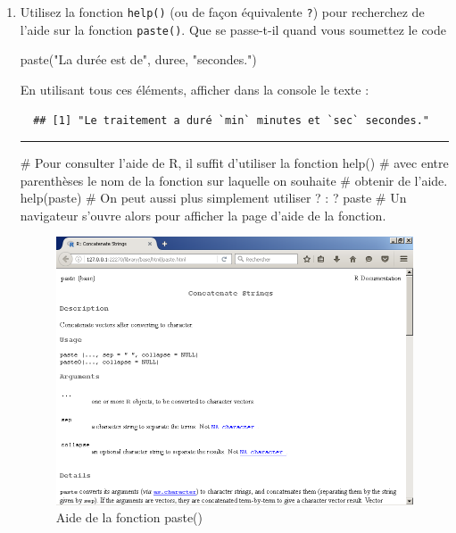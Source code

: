 \documentclass[12pt,twosided, notitlepage]{book}
\newenvironment{Shaded}{}{}
\newcommand{\KeywordTok}[1]{\textcolor[rgb]{0.00,0.00,1.00}{{#1}}}
\newcommand{\StringTok}[1]{\textcolor[rgb]{0.00,0.50,0.50}{{#1}}}
\newcommand{\CommentTok}[1]{\textcolor[rgb]{0.00,0.50,0.00}{{#1}}}
\newcommand{\NormalTok}[1]{{#1}}
\newif \ifsol
\renewenvironment{Shaded}{\begin{snugshade}}{\end{snugshade}}
\begin{document}
\begin{enumerate}
  \bigskip  \fi 
\item
  Utilisez la fonction \texttt{help()} (ou de façon équivalente
  \texttt{?}) pour recherchez de l'aide sur la fonction
  \texttt{paste()}.
  Que se passe-t-il quand vous soumettez le code

\begin{Shaded}
\begin{Highlighting}[]
\KeywordTok{paste}\NormalTok{(}\StringTok{"La durée est de"}\NormalTok{, duree, }\StringTok{"secondes."}\NormalTok{)}
\end{Highlighting}
\end{Shaded}

  En utilisant tous ces éléments, afficher dans la console le texte :

\begin{verbatim}
  ## [1] "Le traitement a duré `min` minutes et `sec` secondes."
\end{verbatim}

  \ifsol 

  \begin{center} \rule{0.5\linewidth}{\linethickness}\end{center}

\begin{Shaded}
\begin{Highlighting}[]
\CommentTok{# Pour consulter l'aide de R, il suffit d'utiliser la fonction help()}
\CommentTok{# avec entre parenthèses le nom de la fonction sur laquelle on souhaite}
\CommentTok{# obtenir de l'aide. }
\KeywordTok{help}\NormalTok{(paste)}
\CommentTok{# On peut aussi plus simplement utiliser ? :}
\NormalTok{? paste}
\CommentTok{# Un navigateur s'ouvre alors pour afficher la page d'aide de la fonction.}
\end{Highlighting}
\end{Shaded}

  \begin{figure}[htbp]
  \centering
  \includegraphics{../figures/Aide_paste.png}
  \caption{Aide de la fonction paste()}
  \end{figure}


\end{enumerate}
\end{document}

